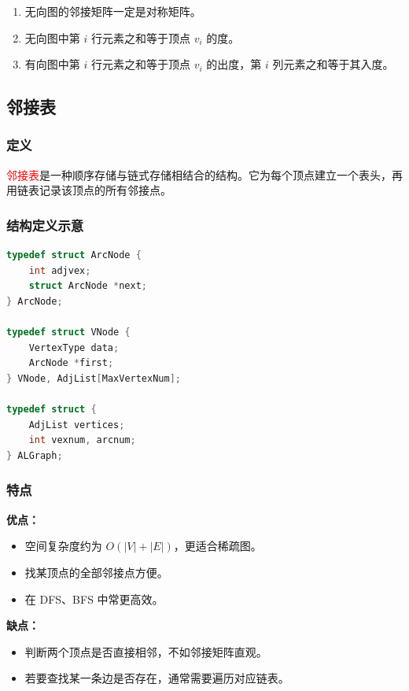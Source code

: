 \documentclass{../../note}
\begin{document}
\begin{enumerate}
  \item 无向图的邻接矩阵一定是对称矩阵。
  \item 无向图中第 $i$ 行元素之和等于顶点 $v_i$ 的度。
  \item 有向图中第 $i$ 行元素之和等于顶点 $v_i$ 的出度，第 $i$ 列元素之和等于其入度。
\end{enumerate}

\subsection{邻接表}

\subsubsection{定义}

\textcolor{red}{邻接表}是一种顺序存储与链式存储相结合的结构。它为每个顶点建立一个表头，再用链表记录该顶点的所有邻接点。

\subsubsection{结构定义示意}

\begin{lstlisting}[language=C]
typedef struct ArcNode {
    int adjvex;
    struct ArcNode *next;
} ArcNode;

typedef struct VNode {
    VertexType data;
    ArcNode *first;
} VNode, AdjList[MaxVertexNum];

typedef struct {
    AdjList vertices;
    int vexnum, arcnum;
} ALGraph;
\end{lstlisting}

\subsubsection{特点}

\textbf{优点：}
\begin{itemize}
  \item 空间复杂度约为 $O(|V| + |E|)$，更适合稀疏图。
  \item 找某顶点的全部邻接点方便。
  \item 在 DFS、BFS 中常更高效。
\end{itemize}

\textbf{缺点：}
\begin{itemize}
  \item 判断两个顶点是否直接相邻，不如邻接矩阵直观。
  \item 若要查找某一条边是否存在，通常需要遍历对应链表。
\end{itemize}
\end{document}
